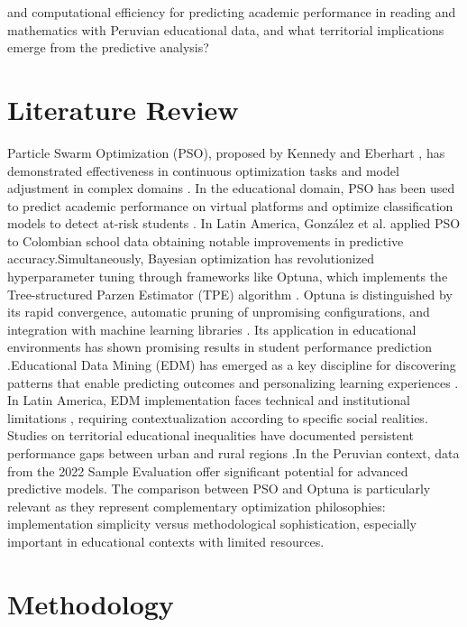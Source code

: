 \documentclass[conference]{IEEEtran}
\begin{document}
and computational efficiency for predicting academic performance in reading and mathematics with Peruvian educational data, and what territorial implications emerge from the predictive analysis?

\section{Literature Review}

Particle Swarm Optimization (PSO), proposed by Kennedy and Eberhart \cite{kennedy1995particle}, has demonstrated effectiveness in continuous optimization tasks and model adjustment in complex domains \cite{liu2020improved}. In the educational domain, PSO has been used to predict academic performance on virtual platforms \cite{zhang2021learning} and optimize classification models to detect at-risk students \cite{sultana2021pso}. In Latin America, González et al. \cite{gonzalez2023edmcolombia} applied PSO to Colombian school data obtaining notable improvements in predictive accuracy.Simultaneously, Bayesian optimization has revolutionized hyperparameter tuning through frameworks like Optuna, which implements the Tree-structured Parzen Estimator (TPE) algorithm \cite{akiba2019optuna}. Optuna is distinguished by its rapid convergence, automatic pruning of unpromising configurations, and integration with machine learning libraries \cite{feurer2019hyperparameter}. Its application in educational environments has shown promising results in student performance prediction \cite{yang2022optunaed}.Educational Data Mining (EDM) has emerged as a key discipline for discovering patterns that enable predicting outcomes and personalizing learning experiences \cite{romero2020educational, baker2014educational}. In Latin America, EDM implementation faces technical and institutional limitations \cite{pena2014educational}, requiring contextualization according to specific social realities. Studies on territorial educational inequalities have documented persistent performance gaps between urban and rural regions \cite{williamson2020datafication}.In the Peruvian context, data from the 2022 Sample Evaluation \cite{minedu2022em} offer significant potential for advanced predictive models. The comparison between PSO and Optuna is particularly relevant as they represent complementary optimization philosophies: implementation simplicity versus methodological sophistication, especially important in educational contexts with limited resources.

\section{Methodology}
\end{document}
